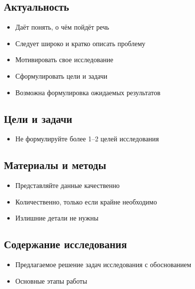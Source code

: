 \documentclass[
  letterpaper,
  DIV=11,
  numbers=noendperiod]{scrartcl}
\providecommand{\tightlist}{%
  \setlength{\itemsep}{0pt}\setlength{\parskip}{0pt}}\usepackage{longtable,booktabs,array}
\begin{document}
\subsection{Актуальность}\label{ux430ux43aux442ux443ux430ux43bux44cux43dux43eux441ux442ux44c-1}

\begin{itemize}
\tightlist
\item
  Даёт понять, о чём пойдёт речь
\item
  Следует широко и кратко описать проблему
\item
  Мотивировать свое исследование
\item
  Сформулировать цели и задачи
\item
  Возможна формулировка ожидаемых результатов
\end{itemize}

\subsection{Цели и
задачи}\label{ux446ux435ux43bux438-ux438-ux437ux430ux434ux430ux447ux438-1}

\begin{itemize}
\tightlist
\item
  Не формулируйте более 1--2 целей исследования
\end{itemize}

\subsection{Материалы и
методы}\label{ux43cux430ux442ux435ux440ux438ux430ux43bux44b-ux438-ux43cux435ux442ux43eux434ux44b-1}

\begin{itemize}
\tightlist
\item
  Представляйте данные качественно
\item
  Количественно, только если крайне необходимо
\item
  Излишние детали не нужны
\end{itemize}

\subsection{Содержание
исследования}\label{ux441ux43eux434ux435ux440ux436ux430ux43dux438ux435-ux438ux441ux441ux43bux435ux434ux43eux432ux430ux43dux438ux44f}

\begin{itemize}
\tightlist
\item
  Предлагаемое решение задач исследования с обоснованием
\item
  Основные этапы работы
\end{itemize}
\end{document}
